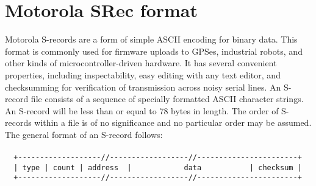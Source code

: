         \section{Motorola SRec format}
                Motorola S-records are a form of simple ASCII encoding for binary data.
            This format is commonly used for firmware uploads to GPSes, industrial
            robots, and other kinds of microcontroller-driven hardware. It has
            several convenient properties, including inspectability, easy editing
            with any text editor, and checksumming for verification of transmission
            across noisy serial lines. An S-record file consists of a sequence of specially formatted ASCII
            character strings. An S-record will be less than or equal to 78 bytes
            in length. The order of S-records within a file is of no significance and no
            particular order may be assumed.\\
            The general format of an S-record follows:
                    {
                        ~\\
                        \usecodefont\\
                        \verb'  +-------------------//------------------//-----------------------+'\\
                        \verb'  | type | count | address  |            data           | checksum |'\\
                        \verb'  +-------------------//------------------//-----------------------+'\\
                    }\\
                    
